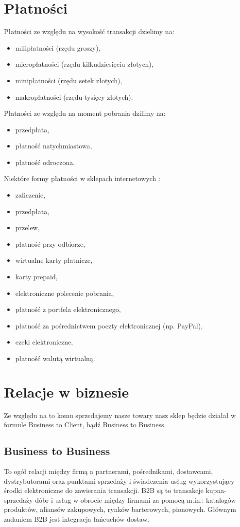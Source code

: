 \documentclass{article}
\begin{document}
\section{Płatności}
Płatności ze względu na wysokość transakcji dzielimy na:
\begin{itemize}
\item milipłatności (rzędu groszy),
\item micropłatności (rzędu kilkudziesięciu złotych),
\item minipłatności (rzędu setek złotych),
\item makropłatności (rzędu tysięcy złotych).
\end{itemize}
Płatności ze względu na moment pobrania dzilimy na:
\begin{itemize}
\item przedpłata,
\item płatność natychmiastowa,
\item płatność odroczona.
\end{itemize}
Niektóre formy płatności w sklepach internetowych \cite{borowski:platnosci}:
\begin{itemize}
\item zaliczenie,
\item przedpłata,
\item przelew,
\item płatność przy odbiorze,
\item wirtualne karty płatnicze,
\item karty prepaid,
\item elektroniczne polecenie pobrania,
\item płatność z portfela elektronicznego,
\item płatność za pośrednictwem poczty elektronicznej (np. PayPal),
\item czeki elektroniczne,
\item płatność walutą wirtualną.
\end{itemize}
\section{Relacje w biznesie}
Ze względu na to komu sprzedajemy nasze towary nasz sklep będzie działał w formule Business to Client, bądź Business to Business.
\subsection{Business to Business}
To ogół relacji między firmą a partnerami, pośrednikami, dostawcami, dystrybutorami oraz punktami
sprzedaży i świadczenia usług wykorzystujący środki elektroniczne do zawierania transakcji. B2B są to
transakcje kupna-sprzedaży dóbr i usług w obrocie między firmami za pomocą m.in.: katalogów produktów, aliansów zakupowych, rynków barterowych, pionowych. Głównym zadaniem B2B jest integracja łańcuchów dostaw.
\end{document}
